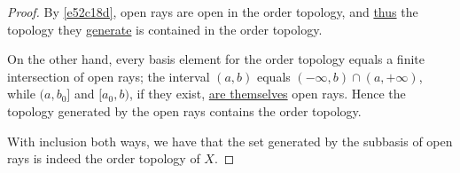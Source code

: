 \begin{proof}
  By \autoref{e52c18d}, open rays are open in the order topology, and
  \href{cc8eb8b}{thus} the topology they \href{d1d3329}{generate} is contained
  in the order topology.

  On the other hand, every basis element for the order topology equals a finite
  intersection of open rays; the interval $(a,b)$ equals
  $(-\infty,b)\cap(a,+\infty)$, while $(a,b_0]$ and $[a_0,b)$, if they exist,
  \href{aaff6da}{are themselves} open rays. Hence the topology generated by the
  open rays contains the order topology.

  With inclusion both ways, we have that the set generated by the subbasis of
  open rays is indeed the order topology of $X$.
\end{proof}
